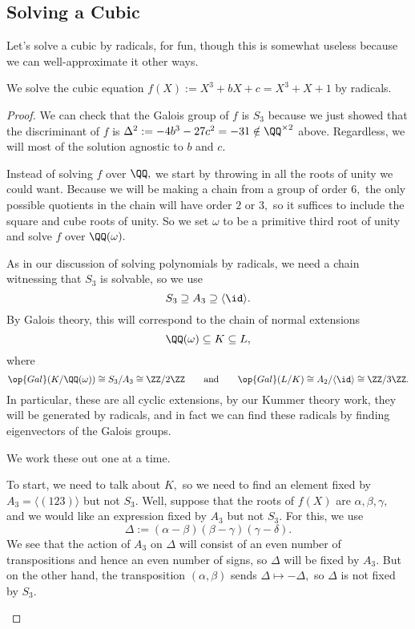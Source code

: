 \subsection{Solving a Cubic}
Let's solve a cubic by radicals, for fun, though this is somewhat useless because we can well-approximate it other ways.
\begin{exe}
	We solve the cubic equation $f(X):=X^3+bX+c=X^3+X+1$ by radicals.
\end{exe}
\begin{proof}
	We can check that the Galois group of $f$ is $S_3$ because we just showed that the discriminant of $f$ is $\Delta^2:=-4b^3-27c^2=-31\notin\QQ^{\times2}$ above. Regardless, we will most of the solution agnostic to $b$ and $c.$

	Instead of solving $f$ over $\QQ,$ we start by throwing in all the roots of unity we could want. Because we will be making a chain from a group of order $6,$ the only possible quotients in the chain will have order $2$ or $3,$ so it suffices to include the square and cube roots of unity. So we set $\omega$ to be a primitive third root of unity and solve $f$ over $\QQ(\omega).$

	As in our discussion of solving polynomials by radicals, we need a chain witnessing that $S_3$ is solvable, so we use
	\[S_3\supseteq A_3\supseteq\langle\id\rangle.\]
	By Galois theory, this will correspond to the chain of normal extensions
	\[\QQ(\omega)\subseteq K\subseteq L,\]
	where
	\[\op{Gal}(K/\QQ(\omega))\cong S_3/A_3\cong\ZZ/2\ZZ\qquad\text{and}\qquad\op{Gal}(L/K)\cong A_2/\langle\id\rangle\cong\ZZ/3\ZZ.\]
	In particular, these are all cyclic extensions, by our Kummer theory work, they will be generated by radicals, and in fact we can find these radicals by finding eigenvectors of the Galois groups.

	We work these out one at a time.
	\begin{listroman}
		\item To start, we need to talk about $K,$ so we need to find an element fixed by $A_3=\langle(123)\rangle$ but not $S_3.$ Well, suppose that the roots of $f(X)$ are $\alpha,\beta,\gamma,$ and we would like an expression fixed by $A_3$ but not $S_3.$ For this, we use
		\[\Delta:=(\alpha-\beta)(\beta-\gamma)(\gamma-\delta).\]
		We see that the action of $A_3$ on $\Delta$ will consist of an even number of transpositions and hence an even number of signs, so $\Delta$ will be fixed by $A_3.$ But on the other hand, the transposition $(\alpha,\beta)$ sends $\Delta\mapsto-\Delta,$ so $\Delta$ is not fixed by $S_3.$
		

\end{listroman}
\end{proof}
